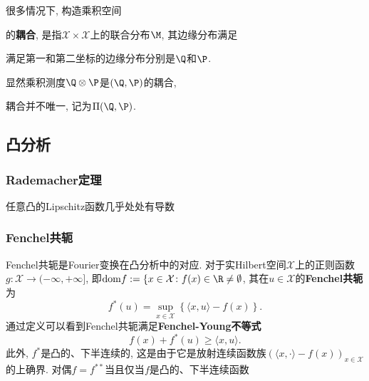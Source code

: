 很多情况下, 构造乘积空间

的\textbf{耦合}, 是指$\mathcal{X} \times \mathcal{X}$上的联合分布$\M$, 其边缘分布满足

满足第一和第二坐标的边缘分布分别是$\Q$和$\P$.


显然乘积测度$\Q \otimes \P$是$(\Q, \P)$的耦合, 

耦合并不唯一, 记为$\Pi(\Q, \P)$. 


\subsection{凸分析}

\subsubsection{Rademacher定理}

\begin{theorem}[Rademacher]\label{thm:Rademacher}
	任意凸的Lipschitz函数几乎处处有导数
\end{theorem}


\subsubsection{Fenchel共轭}

Fenchel共轭是Fourier变换在凸分析中的对应. 
对于实Hilbert空间$\mathcal{X}$上的正则函数$g \colon \mathcal{X} \to (-\infty, +\infty]$, 即$\mathrm{dom} f := \{x \in \mathcal{X} \colon f(x) \in \R \neq \emptyset$, 其在$u \in \mathcal{X}$的\textbf{Fenchel共轭}为
\begin{equation}
	f^*(u) = \sup_{x \in \mathcal{X}} \left\{ \langle x, u \rangle - f(x) \right\}. 
\end{equation}
通过定义可以看到Fenchel共轭满足\textbf{Fenchel-Young不等式}
\begin{equation}
	f(x) + f^*(u) \geq \langle x, u \rangle. 
\end{equation}
此外, $f^*$是凸的、下半连续的, 这是由于它是放射连续函数族$(\langle x, \cdot \rangle - f(x))_{x \in \mathcal{X}}$的上确界. 
对偶$f = f^{**}$当且仅当$f$是凸的、下半连续函数













































